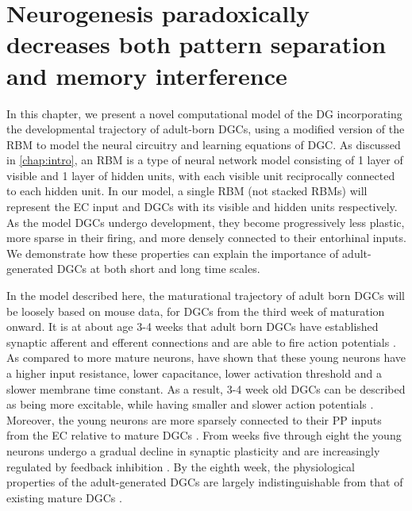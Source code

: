
\chapter{Neurogenesis paradoxically decreases both pattern separation and memory interference}
\label{chap:ng-paradox} 

In this chapter, we present a novel computational model of the \ac{DG} incorporating the
developmental trajectory of adult-born \acp{DGC}, using a modified version of the
\ac{RBM} to model the neural circuitry and learning
equations of \ac{DGC}. 
As discussed in \cref{chap:intro}, an \ac{RBM} is a type of neural network model consisting of 
1 layer of visible and 1 layer of hidden units, with each visible unit reciprocally connected
to each hidden unit. 
In our model, a single \ac{RBM} (not stacked RBMs) will represent 
the \ac{EC} input and \acp{DGC} with its visible and hidden units respectively.
As the model \acp{DGC} undergo development, they become
progressively less plastic, more sparse in their firing, and more densely
connected to their entorhinal inputs. 
We demonstrate how these properties can
explain the importance of adult-generated \acp{DGC} at both short and long time
scales. 

In the model described here, the maturational trajectory of adult born \acp{DGC}
will be loosely based on mouse data, for \acp{DGC} 
from the third week of maturation onward. 
It is at about age 3-4 weeks that adult born \acp{DGC} have established synaptic
afferent and efferent connections and are able to fire action potentials \citep{granule_cell_maturation}.
As compared to more mature neurons, \citet{enhanced_synaptic_plasticity} have shown that these young 
neurons have a higher input resistance, lower capacitance, lower activation threshold and 
a slower membrane time constant.
As a result, 3-4 week old \acp{DGC} can be described as being more excitable, 
while having smaller and slower 
action potentials \citep{enhanced_synaptic_plasticity,snyder-et-al-01}. 
Moreover, the young neurons are more sparsely connected to their \ac{PP} 
inputs from the \ac{EC} relative to mature
\acp{DGC} \citep{neurogenesis_dictating_the_tone}.
From weeks five through eight the young neurons undergo a
gradual decline in synaptic plasticity and are increasingly regulated by
feedback inhibition \citep{temprana-et-al-2015}.
By the eighth week, the physiological properties of the adult-generated \acp{DGC} are
largely indistinguishable from that of existing mature 
\acp{DGC} \citep{temprana-et-al-2015,neurogenesis_dictating_the_tone}.

